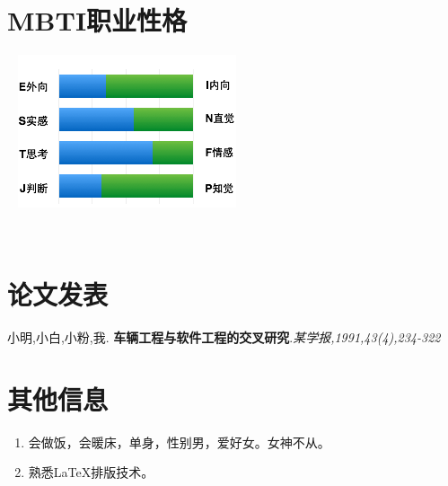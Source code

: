 \documentclass[]{friggeri-cv}
\begin{document}
\begin{aside}
~
~
~
  \section{MBTI职业性格}
  ~
    \includegraphics[scale=0.5]{img/personal.png}
    ~
\end{aside}

~
\section{论文发表}
小明,小白,小粉,我.
\textbf{车辆工程与软件工程的交叉研究}.\emph{某学报,1991,43(4),234-322}
\\
\section{其他信息}
\begin{enumerate}
\item 会做饭，会暖床，单身，性别男，爱好女。女神不从。
\item 熟悉\LaTeX 排版技术。
\end{enumerate}


% 
\end{document}
